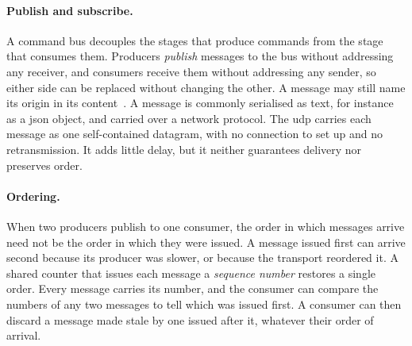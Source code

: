 \paragraph{Publish and subscribe.} A command bus decouples the stages that produce commands from the
stage that consumes them. Producers \emph{publish} messages to the bus without addressing any
receiver, and consumers receive them without addressing any sender, so either side can be replaced
without changing the other. A message may still name its origin in its content~\cite{eugster2003}. A
message is commonly serialised as text, for instance as a
\gls{json} object, and carried over a network protocol. The \gls{udp} carries each message as one
self-contained datagram, with no connection to set up and no retransmission. It adds little delay,
but it neither guarantees delivery nor preserves order.

\paragraph{Ordering.} When two producers publish to one consumer, the order in which messages
arrive need not be the order in which they were issued. A message issued first can arrive second
because its producer was slower, or because the transport reordered it. A shared counter that
issues each message a \emph{sequence number} restores a single order. Every message carries its
number, and the consumer can compare the numbers of any two messages to tell which was issued
first. A consumer can then discard a message made stale by one issued after it, whatever their
order of arrival.

\noautobreak

